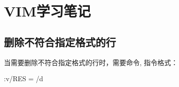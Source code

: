\section{VIM学习笔记}

\subsection{删除不符合指定格式的行}
当需要删除不符合指定格式的行时，需要命令, 指令格式：
\begin{messagebox}
:v/RES = /d
\end{messagebox}
